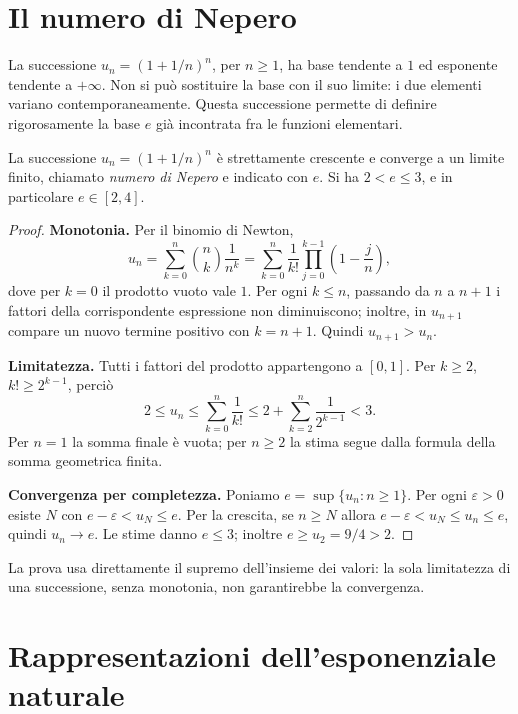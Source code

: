 \section{Il numero di Nepero}
\label{sec:numero-nepero}

La successione $u_n=(1+1/n)^n$, per $n\ge1$, ha base tendente a $1$ ed esponente tendente a $+\infty$. Non si può sostituire la base con il suo limite: i due elementi variano contemporaneamente. Questa successione permette di definire rigorosamente la base $e$ già incontrata fra le funzioni elementari.

\begin{proposizione}
La successione $u_n=(1+1/n)^n$ è strettamente crescente e converge a un limite finito, chiamato \emph{numero di Nepero} e indicato con $e$. Si ha $2<e\le3$, e in particolare $e\in[2,4]$.
\end{proposizione}
\begin{proof}
\textbf{Monotonia.} Per il binomio di Newton,
\[
u_n=\sum_{k=0}^n\binom nk\frac1{n^k}
=\sum_{k=0}^n\frac1{k!}\prod_{j=0}^{k-1}\left(1-\frac jn\right),
\]
dove per $k=0$ il prodotto vuoto vale $1$. Per ogni $k\le n$, passando da $n$ a $n+1$ i fattori della corrispondente espressione non diminuiscono; inoltre, in $u_{n+1}$ compare un nuovo termine positivo con $k=n+1$. Quindi $u_{n+1}>u_n$.

\textbf{Limitatezza.} Tutti i fattori del prodotto appartengono a $[0,1]$. Per $k\ge2$, $k!\ge2^{k-1}$, perciò
\[
2\le u_n\le\sum_{k=0}^n\frac1{k!}
\le2+\sum_{k=2}^n\frac1{2^{k-1}}<3.
\]
Per $n=1$ la somma finale è vuota; per $n\ge2$ la stima segue dalla formula della somma geometrica finita.

\textbf{Convergenza per completezza.} Poniamo $e=\sup\{u_n:n\ge1\}$. Per ogni $\varepsilon>0$ esiste $N$ con $e-\varepsilon<u_N\le e$. Per la crescita, se $n\ge N$ allora $e-\varepsilon<u_N\le u_n\le e$, quindi $u_n\to e$. Le stime danno $e\le3$; inoltre $e\ge u_2=9/4>2$.
\end{proof}

La prova usa direttamente il supremo dell'insieme dei valori: la sola limitatezza di una successione, senza monotonia, non garantirebbe la convergenza.

\section{Rappresentazioni dell'esponenziale naturale}

